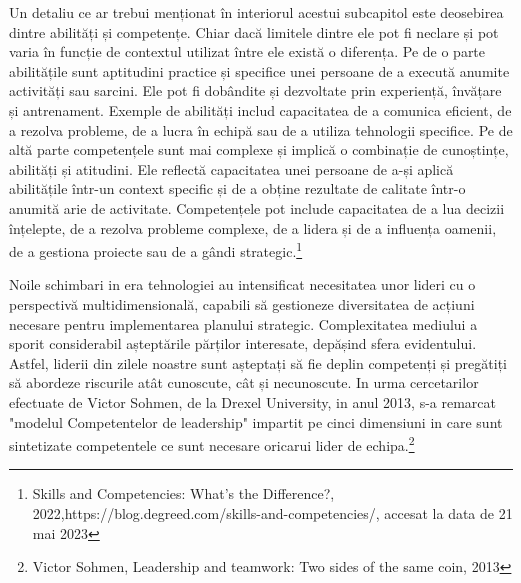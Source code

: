 \documentclass[a4paper, 12pt]{article}
\begin{document}
	\quad  Un detaliu ce ar trebui menționat în interiorul acestui subcapitol este deosebirea dintre abilități și competențe. Chiar dacă limitele dintre ele pot fi neclare și pot varia în funcție de contextul utilizat între ele există o diferența. Pe de o parte abilitățile sunt aptitudini practice și specifice unei persoane de a execută anumite activități sau sarcini. Ele pot fi dobândite și dezvoltate prin experiență, învățare și antrenament. Exemple de abilități includ capacitatea de a comunica eficient, de a rezolva probleme, de a lucra în echipă sau de a utiliza tehnologii specifice. Pe de altă parte competențele sunt mai complexe și implică o combinație de cunoștințe, abilități și atitudini. Ele reflectă capacitatea unei persoane de a-și aplică abilitățile într-un context specific și de a obține rezultate de calitate într-o anumită arie de activitate. Competențele pot include capacitatea de a lua decizii înțelepte, de a rezolva probleme complexe, de a lidera și de a influența oamenii, de a gestiona proiecte sau de a gândi strategic.\footnote{Skills and Competencies: What’s the Difference?, 2022,https://blog.degreed.com/skills-and-competencies/, accesat la data de 21 mai 2023}
		
	\quad\quad Noile schimbari in era tehnologiei au intensificat necesitatea unor lideri cu o perspectivă multidimensională, capabili să gestioneze diversitatea de acțiuni necesare pentru implementarea planului strategic. Complexitatea mediului a sporit considerabil așteptările părților interesate, depășind sfera evidentului. Astfel, liderii din zilele noastre sunt așteptați să fie deplin competenți și pregătiți să abordeze riscurile atât cunoscute, cât și necunoscute. In urma cercetarilor efectuate de Victor Sohmen, de la Drexel University, in anul 2013, s-a remarcat "modelul Competentelor de leadership" impartit pe cinci dimensiuni in care sunt sintetizate competentele ce sunt necesare oricarui lider de echipa.\footnote {Victor Sohmen, Leadership and teamwork: Two sides of the same coin, 2013}
\end{document}
